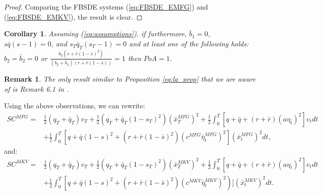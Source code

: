 \documentclass[11pt]{article}
\newtheorem{remark}{Remark}
\newtheorem{corollary}{Corollary}
\begin{document}
\begin{proof}
    Comparing the FBSDE systems (\ref{eq:FBSDE_EMFG}) and (\ref{eq:FBSDE_EMKV}), the result is clear.
\end{proof}

\begin{corollary}
Assuming (\ref{eq:assumptions}), if furthermore, $\bar{b}_1=0$, $s\bar{q}(s-1)=0$, and $s_T\bar{q}_T(s_T-1)=0$ and at least one of the following holds: $b_2=\bar{b}_2=0$ or $\frac{b_2(r+\bar{r}(1-\bar{s})^2)}{(b_2+\bar{b}_2)(r+\bar{r}(1-\bar{s}))}=1$
then $PoA=1$.
\label{corollary_1}
\end{corollary}

\begin{remark}
The only result similar to Proposition \ref{eq:lq_prop} that we are aware of is Remark 6.1 in \cite{nourian2013nash}.
\end{remark}

Using the above observations, we can rewrite:
\begin{equation}
\begin{split}
    SC^{MFG}=&\frac{1}{2}(q_T+\bar{q}_T)v_T+\frac{1}{2}\left(q_T+\bar{q}_T(1-s_T)^2\right)(\bar{x}_T^{MFG})^2+\frac{1}{2}\int_0^T \left[q+\bar{q}+(r+\bar{r})(a\eta_t)^2\right]v_tdt\\
    &+\frac{1}{2}\int_0^T\left[q+\bar{q}(1-s)^2+(r+\bar{r}(1-\bar{s})^2)(c^{MFG}\bar{\eta}_t^{MFG})^2\right](\bar{x}_t^{MFG})^2dt,
\end{split}
\label{eq:SC_MFG_1}
\end{equation}
and:
\begin{equation}
\begin{split}
    SC^{MKV}=&\frac{1}{2}(q_T+\bar{q}_T)v_T+\frac{1}{2}\left(q_T+\bar{q}_T(1-s_T)^2\right)(\bar{x}_T^{MKV})^2+ \frac{1}{2}\int_0^T \left[q+\bar{q}+(r+\bar{r})(a\eta_t)^2\right]v_tdt \\
    &+\frac{1}{2}\int_0^T\left[q+\bar{q}(1-s)^2+(r+\bar{r}(1-\bar{s})^2)(c^{MKV}\bar{\eta}_t^{MKV})^2\right)](\bar{x}_t^{MKV})^2dt.
\end{split}
\label{eq:SC_MKV_1}
\end{equation}
\end{document}
